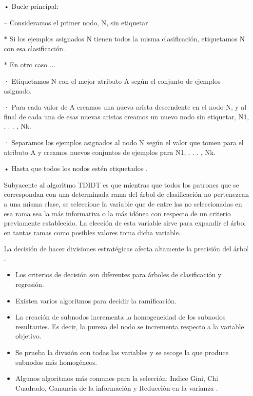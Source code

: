 \documentclass[10pt]{article}
\begin{document}
\setlength{\parskip}{2mm}

• Bucle principal:

\setlength{\parskip}{2mm}

– Consideramos el primer nodo, N, sin etiquetar
\setlength{\parskip}{2mm}

$\ast$ Si los ejemplos asignados N tienen todos la misma clasificación,  etiquetamos N con esa clasificación.

\setlength{\parskip}{2mm}

$\ast$ En otro caso ...

\setlength{\parskip}{2mm}

· Etiquetamos N con el mejor atributo A según el conjunto de
ejemplos asignado.
\setlength{\parskip}{2mm}

· Para cada valor de A creamos una nueva arista descendente en el nodo N, y al final de cada una de esas nuevas aristas creamos un nuevo nodo sin etiquetar, N1, . . . , Nk.

\setlength{\parskip}{2mm}

· Separamos los ejemplos asignados al nodo N según el valor que tomen para el atributo A y creamos nuevos conjuntos de ejemplos para N1, . . . , Nk.


\setlength{\parskip}{2mm}

• Hasta que todos los nodos estén etiquetados \cite{IEEEreferencias:Ref15}.

Subyacente al algoritmo TDIDT es que mientras que todos los patrones que se correspondan con una determinada rama del árbol de clasificación no pertenezcan a una misma clase, se seleccione la variable que de entre las no seleccionadas en esa rama sea la más informativa o la más idónea con respecto de un criterio previamente establecido. La elección de esta variable sirve para expandir el árbol en tantas ramas como posibles valores toma dicha variable\cite{IEEEreferencias:Ref15}.

La decisión de hacer divisiones estratégicas afecta altamente la precisión del árbol \cite{IEEEreferencias:Ref44}.

\begin{itemize}
    \item Los criterios de decisión son diferentes para árboles de clasificación y regresión.
    \item Existen varios algoritmos para decidir la ramificación.
    \item La creación de subnodos incrementa la homogeneidad de los subnodos resultantes. Es decir, la pureza del nodo se incrementa respecto a la variable objetivo.
    \item  Se prueba la división con todas las variables y se escoge la que produce subnodos más homogéneos.
    \item Algunos algoritmos más comunes para la selección: Indice Gini, Chi Cuadrado, Ganancia de la información y Reducción en la varianza \cite{IEEEreferencias:Ref44}.

\end{itemize}
\newpage
\end{document}
